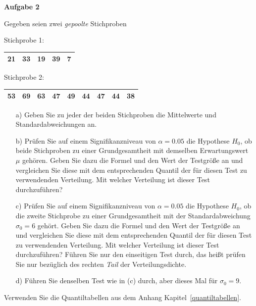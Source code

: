 \textbf{Aufgabe 2}

Gegeben seien zwei \textsl{gepoolte} Stichproben

Stichprobe 1:

\begin{tabular}{|c|c|c|c|c|}
\hline
21 & 33 & 19 & 39 & 7\\
\hline
\end{tabular}

Stichprobe 2:

\begin{tabular}{|c|c|c|c|c|c|c|c|c|}
\hline
53 & 69 & 63 & 47 & 49 & 44 & 47 & 44 & 38\\
\hline
\end{tabular}

\begin{enumerate}
\item[a)] Geben Sie zu jeder der beiden Stichproben die Mittelwerte und Standardabweichungen an.
\item[b)] Prüfen Sie auf einem Signifikanzniveau von $\alpha = 0.05$ die Hypothese $H_0$,
 ob beide Stichproben zu einer Grundgesamtheit
 mit demselben Erwartungswert $\mu$ gehören. Geben Sie dazu die Formel und den Wert
 der Testgröße an und vergleichen Sie diese mit dem entsprechenden Quantil der für diesen
 Test zu verwendenden Verteilung. Mit welcher Verteilung ist dieser Test durchzuführen?
\item[c)] Prüfen Sie auf einem Signifikanzniveau von $\alpha = 0.05$ die Hypothese $H_0$,
 ob die zweite Stichprobe zu einer Grundgesamtheit
 mit der Standardabweichung $\sigma_0 = 6$ gehört. Geben Sie dazu die Formel und den Wert
 der Testgröße an und vergleichen Sie diese mit dem entsprechenden Quantil der für diesen
 Test zu verwendenden Verteilung. Mit welcher Verteilung ist dieser Test durchzuführen?
 Führen Sie nur den einseitigen Test durch, das heißt prüfen Sie nur bezüglich
 des rechten \textsl{Tail} der Verteilungsdichte.
\item[d)] Führen Sie denselben Test wie in (c) durch, aber dieses Mal für $\sigma_0 = 9$.
\end{enumerate}

Verwenden Sie die Quantiltabellen aus dem Anhang Kapitel~\ref{quantiltabellen}.
